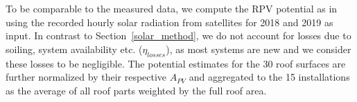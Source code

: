 To be comparable to the measured data, we compute the RPV potential as in  using the recorded hourly solar radiation from satellites for 2018 and 2019 \cite{stockli_daily_2013} as input.
In contrast to Section~\ref{solar_method}, we do not account for losses due to soiling, system availability etc. ($\eta_\mathit{losses}$), as most systems are new and we consider these losses to be negligible. 
The potential estimates for the 30 roof surfaces are further normalized by their respective $A_{PV}$ and aggregated to the 15 installations as the average of all roof parts weighted by the full roof area.

